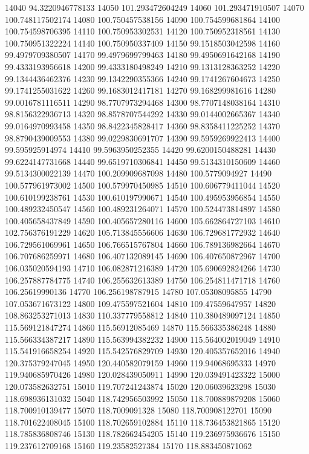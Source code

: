 {14040 94.3220946778133
14050 101.293472604249
14060 101.293471910507
14070 100.748117502174
14080 100.750457538156
14090 100.754599681864
14100 100.754598706395
14110 100.750953302531
14120 100.750952318561
14130 100.750951322224
14140 100.750950337409
14150 99.1518503042598
14160 99.4979709380507
14170 99.4979699799463
14180 99.4950691642168
14190 99.4333193956618
14200 99.4333180498249
14210 99.1313128363252
14220 99.1344436462376
14230 99.1342290355366
14240 99.1741267604673
14250 99.1741255031622
14260 99.1683012417181
14270 99.168299981616
14280 99.0016781116511
14290 98.7707973294468
14300 98.7707148038164
14310 98.8156322936713
14320 98.8578707544292
14330 99.0144002665367
14340 99.0164970993458
14350 98.8422345828417
14360 98.8358411225252
14370 98.8790439009553
14380 99.0229830691707
14390 99.5959269922413
14400 99.595925914974
14410 99.5963950252355
14420 99.6200150488281
14430 99.6224147731668
14440 99.6519710306841
14450 99.5134310150609
14460 99.5134300022139
14470 100.209909687098
14480 100.5779094927
14490 100.577961973002
14500 100.579970450985
14510 100.606779411044
14520 100.610199238761
14530 100.610197990671
14540 100.495953956854
14550 100.489232450547
14560 100.489231264071
14570 100.524473814897
14580 100.405658437849
14590 100.405657280116
14600 105.662864727103
14610 102.756376191229
14620 105.713845556606
14630 106.729681772932
14640 106.729561069961
14650 106.766515767804
14660 106.789136982664
14670 106.707686259971
14680 106.407132089145
14690 106.407650872967
14700 106.035020594193
14710 106.082871216389
14720 105.690692824266
14730 106.257887784775
14740 106.255632613389
14750 106.254811471718
14760 106.25619990136
14770 106.256198787915
14780 107.05308095855
14790 107.053671673122
14800 109.475597521604
14810 109.47559647957
14820 108.863253271013
14830 110.337779558812
14840 110.380489097124
14850 115.569121847274
14860 115.56912085469
14870 115.566335386248
14880 115.566334387217
14890 115.563994382232
14900 115.564002019049
14910 115.541916658254
14920 115.542576829709
14930 120.405357652016
14940 120.375379247045
14950 120.440582079159
14960 119.94068695333
14970 119.940685970426
14980 120.028439050911
14990 120.039491423322
15000 120.073582632751
15010 119.707241243874
15020 120.06039623298
15030 118.698936131032
15040 118.742956503992
15050 118.700889879208
15060 118.700910139477
15070 118.7009091328
15080 118.700908122701
15090 118.701622408045
15100 118.702659102884
15110 118.736453821865
15120 118.785836808746
15130 118.782662454205
15140 119.236975936676
15150 119.237612709168
15160 119.23582527384
15170 118.883450871062
}
